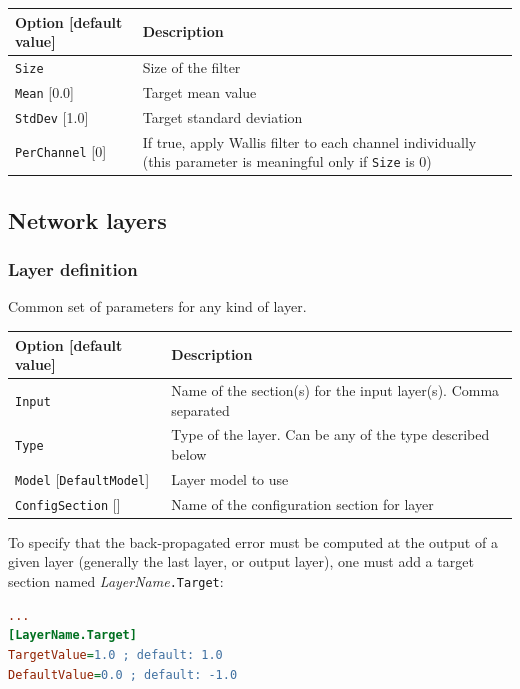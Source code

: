 \documentclass[a4paper,11pt,oneside]{article}
\begin{document}
\begin{center}
 \begin{tabular}{| p{5cm} | p{10cm} | }
 \hline
 Option [default value] & Description\\
 \hline\hline
  \cellcolor{requiredcolor}\lstinline!Size! & Size of the filter \\
  \lstinline!Mean! [0.0] & Target mean value \\
  \lstinline!StdDev! [1.0] & Target standard deviation \\
  \lstinline!PerChannel! [0] & If true, apply Wallis filter to each channel
  individually (this parameter is meaningful only if \lstinline!Size! is 0) \\
 \hline
\end{tabular}
\end{center}

\subsection{Network layers}

\subsubsection{Layer definition}
Common set of parameters for any kind of layer.

\begin{center}
 \begin{tabular}{| p{5cm} | p{10cm} | }
 \hline
 Option [default value] & Description\\
 \hline\hline
  \cellcolor{requiredcolor}\lstinline!Input! & Name of the section(s) for the
  input layer(s). Comma separated \\
  \cellcolor{requiredcolor}\lstinline!Type! & Type of the layer. Can be any of
  the type described below \\
  \lstinline!Model! [\lstinline!DefaultModel!] & Layer model to use \\
  \lstinline!ConfigSection! [] & Name of the configuration section for layer \\
 \hline
\end{tabular}
\end{center}

To specify that the back-propagated error must be computed at the output of a
given layer (generally the last layer, or output layer), one must add a target
section named \emph{LayerName}\lstinline!.Target!:
\begin{lstlisting}[language=ini]
...
[LayerName.Target]
TargetValue=1.0 ; default: 1.0
DefaultValue=0.0 ; default: -1.0
\end{lstlisting}
\end{document}

